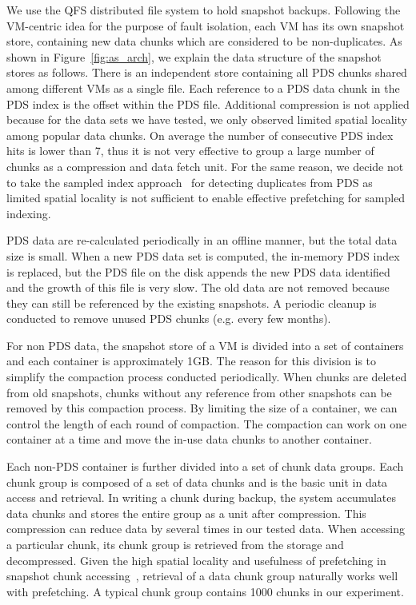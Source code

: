 We use the QFS distributed file system to hold snapshot backups.
Following the VM-centric idea for the purpose of fault isolation,
each VM has its own snapshot store, containing new data chunks which are considered
to be non-duplicates.
As shown in Figure~\ref{fig:as_arch}, we explain the data structure of the snapshot stores as follows.
There is an independent store containing all PDS chunks shared among different VMs as
a single file.
Each reference to a PDS data chunk in the PDS index is the offset within the PDS file.
Additional compression is not applied because 
for the data sets we have tested, we only observed limited spatial locality 
among popular data chunks. On average the number of consecutive PDS index hits is lower than 7,
thus it is not very effective to group a large number of chunks as a compression and data fetch unit. 
For the same reason, we decide not to take the sampled index approach~\cite{Guo2011} 
for detecting duplicates from PDS as limited spatial locality is not sufficient to enable
effective prefetching for sampled indexing.

PDS data are re-calculated periodically in an offline manner, but 
the total data size is small.  When
a new PDS data  set is computed, the in-memory PDS index is replaced, but 
the PDS file on the disk appends the  new PDS data identified and the growth of this file is very slow. 
The old data are not removed because they can still be referenced by the existing snapshots. 
A periodic cleanup is conducted  to remove unused PDS chunks (e.g. every few months). 


For non PDS data, the snapshot store of a VM is  divided into a set of containers and 
each container is approximately 1GB.  The reason for this  division is to simplify the compaction process
conducted periodically. When  chunks are deleted from old snapshots,
chunks without any reference from other snapshots can be removed by this compaction process.
By limiting the size of a container, we can control the length of each round of compaction.
The compaction  can work on one container at a time and move the in-use data chunks to another container. 

Each non-PDS container is further divided into a set of chunk data groups. Each chunk group is composed of
a set of data chunks and is the basic unit in data access and retrieval. 
In writing a chunk during backup, the system accumulates data chunks and stores the entire
group as a unit after compression. This  compression can reduce data by several times  in our tested data.
When accessing a particular chunk, its chunk group is retrieved from the storage
and decompressed. Given the high spatial locality and usefulness of prefetching  in 
snapshot chunk accessing~\cite{Guo2011,Rhea2008},
retrieval of  a data chunk  group naturally works well with prefetching. 
A  typical chunk group contains 1000 chunks in our experiment.

